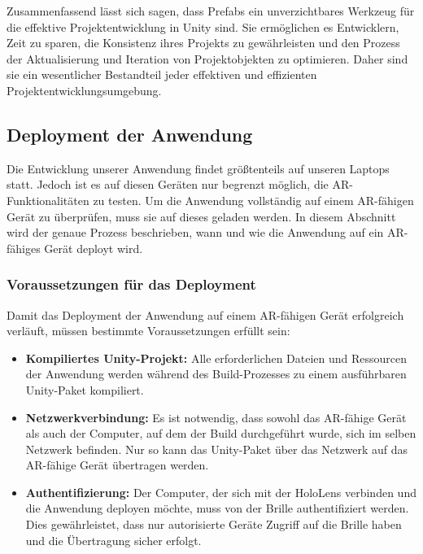 Zusammenfassend lässt sich sagen, dass Prefabs ein unverzichtbares Werkzeug für die effektive Projektentwicklung in Unity sind. Sie ermöglichen es Entwicklern, Zeit zu sparen, die Konsistenz ihres Projekts zu gewährleisten und den Prozess der Aktualisierung und Iteration von Projektobjekten zu optimieren. Daher sind sie ein wesentlicher Bestandteil jeder effektiven und effizienten Projektentwicklungsumgebung.


\subsection{Deployment der Anwendung} 

Die Entwicklung unserer Anwendung findet größtenteils auf unseren Laptops statt. Jedoch ist es auf diesen Geräten nur begrenzt möglich, die AR-Funktionalitäten zu testen. Um die Anwendung vollständig auf einem AR-fähigen Gerät zu überprüfen, muss sie auf dieses geladen werden. In diesem Abschnitt wird der genaue Prozess beschrieben, wann und wie die Anwendung auf ein AR-fähiges Gerät deployt wird.

\subsubsection{Voraussetzungen für das Deployment}

Damit das Deployment der Anwendung auf einem AR-fähigen Gerät erfolgreich verläuft, müssen bestimmte Voraussetzungen erfüllt sein:

\begin{itemize}
    \item \textbf{Kompiliertes Unity-Projekt:} Alle erforderlichen Dateien und Ressourcen der Anwendung werden während des Build-Prozesses zu einem ausführbaren Unity-Paket kompiliert.

    \item \textbf{Netzwerkverbindung:} Es ist notwendig, dass sowohl das AR-fähige Gerät als auch der Computer, auf dem der Build durchgeführt wurde, sich im selben Netzwerk befinden. Nur so kann das Unity-Paket über das Netzwerk auf das AR-fähige Gerät übertragen werden.

    \item \textbf{Authentifizierung:} Der Computer, der sich mit der HoloLens verbinden und die Anwendung deployen möchte, muss von der Brille authentifiziert werden. Dies gewährleistet, dass nur autorisierte Geräte Zugriff auf die Brille haben und die Übertragung sicher erfolgt.
\end{itemize}

